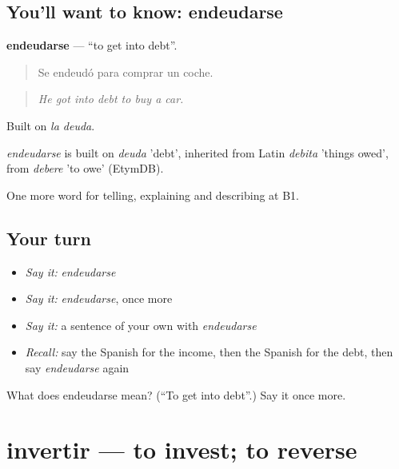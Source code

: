 \subsection*{You'll want to know: endeudarse}
\textbf{endeudarse} — \textquotedblleft{}to get into debt\textquotedblright{}.

\begin{quote}
Se endeudó para comprar un coche.
\end{quote}

\begin{quote}
\emph{He got into debt to buy a car.}
\end{quote}

Built on \emph{la deuda}.

\begin{cousinweb}
\emph{endeudarse} is built on \emph{deuda} 'debt', inherited from Latin \emph{debita} 'things owed', from \emph{debere} 'to owe' (EtymDB).
\end{cousinweb}

\begin{grammarlens}[title={What you've built}]
One more word for telling, explaining and describing at B1.
\end{grammarlens}

\subsection*{Your turn}
\begin{itemize}
\raggedright
  \item \emph{Say it:} \emph{endeudarse}
  \item \emph{Say it:} \emph{endeudarse}, once more
  \item \emph{Say it:} a sentence of your own with \emph{endeudarse}
  \item \emph{Recall:} say the Spanish for the income, then the Spanish for the debt, then say \emph{endeudarse} again
\end{itemize}

\begin{tcolorbox}[breakable,colback=teal!4,colframe=teal!35!black,title={Before you move on}]
What does endeudarse mean? (\textquotedblleft{}To get into debt\textquotedblright{}.) Say it once more.
\end{tcolorbox}
\section[invertir]{invertir — to invest; to reverse}

